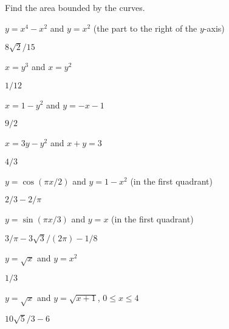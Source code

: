\begin{exercises}

\noindent Find the area bounded by the curves.

\begin{exercise} $y=x^4-x^2$ and $y=x^2$ (the part to the right of the $y$-axis)
\begin{answer} $8\sqrt2/15$
\end{answer}\end{exercise}

\begin{exercise} $x=y^3$ and $x=y^2$
\begin{answer} $1/12$
\end{answer}\end{exercise}

\begin{exercise} $x=1-y^2$ and $y=-x-1$
\begin{answer} $9/2$
\end{answer}\end{exercise}

\begin{exercise} $x=3y-y^2$ and $x+y=3$
\begin{answer} $4/3$
\end{answer}\end{exercise}

\begin{exercise} $y=\cos(\pi x/2)$ and $y=1- x^2$ (in the first quadrant)
\begin{answer} $2/3-2/\pi$
\end{answer}\end{exercise}

\begin{exercise} $y=\sin(\pi x/3)$ and $y=x$ (in the first quadrant)
\begin{answer} $3/\pi - 3\sqrt3/(2\pi)-1/8$
\end{answer}\end{exercise}

\begin{exercise} $y=\sqrt{x}$ and $y=x^2$
\begin{answer} $1/3$
\end{answer}\end{exercise}

\begin{exercise} $y=\sqrt x$ and $y=\sqrt{x+1}$, $0\le x\le 4$
\begin{answer} $10\sqrt{5}/3-6$
\end{answer}\end{exercise}


\end{exercises}
